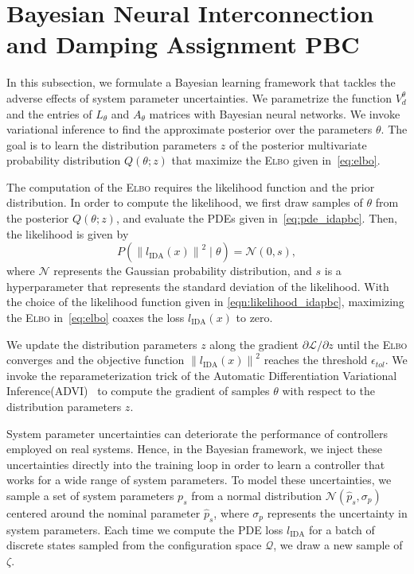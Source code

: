 
\section{Bayesian Neural Interconnection and Damping Assignment PBC}

In this subsection, we formulate a Bayesian learning framework that tackles the
adverse effects of system parameter uncertainties. 
%
We parametrize the function $V_d^\theta$ and the entries of $L_\theta$ and
$A_\theta$ matrices with Bayesian neural networks. 
%
We invoke variational inference to find the approximate posterior over the
parameters $\theta$. The goal is to learn the distribution parameters $z$ of the
posterior multivariate probability distribution $Q(\theta;z)$ that maximize the
\textsc{Elbo} given in~\eqref{eq:elbo}.
%


The computation of the \textsc{Elbo} requires the likelihood function and the
prior distribution.
%
In order to compute the likelihood, we first draw samples of $\theta$ from the
posterior $Q(\theta;z)$, and evaluate the PDEs given in~\eqref{eq:pde_idapbc}.
Then, the likelihood is given by
\begin{equation}
    P( \left\| l_{\textrm{IDA}} (x) \right\|^2 \mid \theta) = \mathcal{N}\left(0, s \right),
    \label{eqn:likelihood_idapbc}
\end{equation}
where $\mathcal{N}$ represents the Gaussian probability distribution, and $s$ is
a hyperparameter that represents the standard deviation of the likelihood.
%
With the choice of the likelihood function given in
\eqref{eqn:likelihood_idapbc}, maximizing the \textsc{Elbo}
in~\eqref{eq:elbo} coaxes the loss $l_{\text{IDA}}(x)$ to zero.


%
We update the distribution parameters $z$ along the gradient $\partial
\mathcal{L}/\partial z$ until the \textsc{Elbo} converges and the objective
function $\left\| l_{\textrm{IDA}} (x) \right\|^2$ reaches the threshold
$\epsilon_{tol}$.
%
We invoke the reparameterization trick of the Automatic Differentiation
Variational Inference(\textsc{ADVI})~\cite{kucukelbir2015automatic} to compute
the gradient of samples $\theta$ with respect to the distribution parameters
$z$.


System parameter uncertainties can deteriorate the performance of controllers
employed on real systems. 
%
Hence, in the Bayesian framework, we inject these uncertainties directly into
the training loop in order to learn a controller that works for a wide range of
system parameters.
%
To model these uncertainties, we sample a set of system parameters $p_s$ from
a normal distribution $\mathcal{N}(\hat{p}_s, \sigma_{p})$ centered around the
nominal parameter $\hat{p}_s$, where $\sigma_{p}$ represents the uncertainty
in system parameters.
%
Each time we compute the PDE loss $l_{\text{IDA}}$ for a batch of discrete
states sampled from the configuration space $\mathcal{Q}$, we draw a new sample
of $\zeta$.


